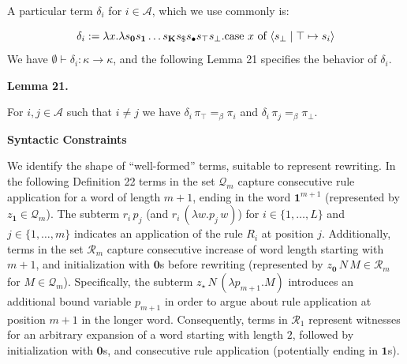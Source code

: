  
A particular term $\delta_{i}$ for $i\in\mathcal{A}$, which we use commonly is:\par
    \[\delta_{i}:=\lambda x.\lambda s_{\mathbf{0}}s_{\mathbf{1}}\ldots s_{\mathbf{K}%
}s_{\$}s_{\bullet}s_{\top}s_{\bot}.\textnormal{{case }}{x}\textnormal{{ of }}%
\langle s_{\bot}\mid\top\mapsto s_{i}\rangle\]    
We have $\emptyset\vdash\delta_{i}:\kappa\to\kappa$, and the following Lemma 21 specifies the behavior of $\delta_{i}$.\par
 
 
 
\par\medskip\noindent\textbf{Lemma 21.}\par
 
 
For $i,j\in\mathcal{A}$ such that $i\neq j$ we have $\delta_{i}\,\pi_{\top}=_{\beta}\pi_{i}$ and $\delta_{i}\,\pi_{j}=_{\beta}\pi_{\bot}$.\par
 
 
 
 
 
\par\medskip\noindent\textbf{Syntactic Constraints}\par
 
 
We identify the shape of “well-formed” terms, suitable to represent rewriting. In the following Definition 22 terms in the set $\mathcal{Q}_{m}$ capture consecutive rule application for a word of length $m+1$, ending in the word $\mathbf{1}^{m+1}$ (represented by $z_{\mathbf{1}}\in\mathcal{Q}_{m}$). The subterm $r_{i}\,p_{j}$ (and $r_{i}\,(\lambda w.p_{j}\,w)$) for $i\in\{1,\ldots,L\}$ and $j\in\{1,\ldots,m\}$ indicates an application of the rule $R_{i}$ at position $j$. Additionally, terms in the set $\mathcal{R}_{m}$ capture consecutive increase of word length starting with $m+1$, and initialization with $\mathbf{0}$s before rewriting (represented by $z_{\mathbf{0}}\,N\,M\in\mathcal{R}_{m}$ for $M\in\mathcal{Q}_{m}$). Specifically, the subterm $z_{\star}\,N\,(\lambda p_{m+1}.M)$ introduces an additional bound variable $p_{m+1}$ in order to argue about rule application at position $m+1$ in the longer word. Consequently, terms in $\mathcal{R}_{1}$ represent witnesses for an arbitrary expansion of a word starting with length $2$, followed by initialization with $\mathbf{0}$s, and consecutive rule application (potentially ending in $\mathbf{1}$s).\par
 
